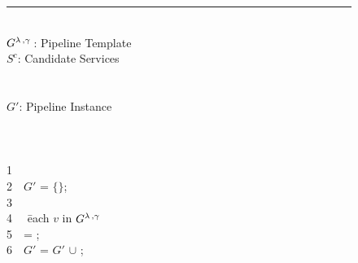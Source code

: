 \newenvironment{redtext}{\footnotesize	\color{gray}}{~~}
\newenvironment{ourcolor}{\color{OurColor}}{~~}
\begin{figure}[!t]

  \hrule\vspace{3pt}
  \begin{ourcolor}
  \begin{tabbing}
      \INPUT\\
      $G^{\lambda\,,\gamma\,}$: Pipeline Template\\
      $S^c$: Candidate Services\\
      ~\\[1pt]
      \OUTPUT\\
      $G'$: Pipeline Instance\\
      ~\\[1pt]
      \\
      \\
      \begin{redtext}1\end{redtext}\\
      \begin{redtext}2\end{redtext}$G'$ = $\{\}$;\\
      \begin{redtext}3\end{redtext}\\
      \begin{redtext}4\end{redtext} \= each $v$ in $G^{\lambda\,,\gamma\,}$\\
      \begin{redtext}5\end{redtext}\tabone \vii = ;\\
      \begin{redtext}6\end{redtext}\tabone $G'$ = $G'$ $\cup$ \vii;\\

\end{tabbing}
\end{ourcolor}
\end{figure}
